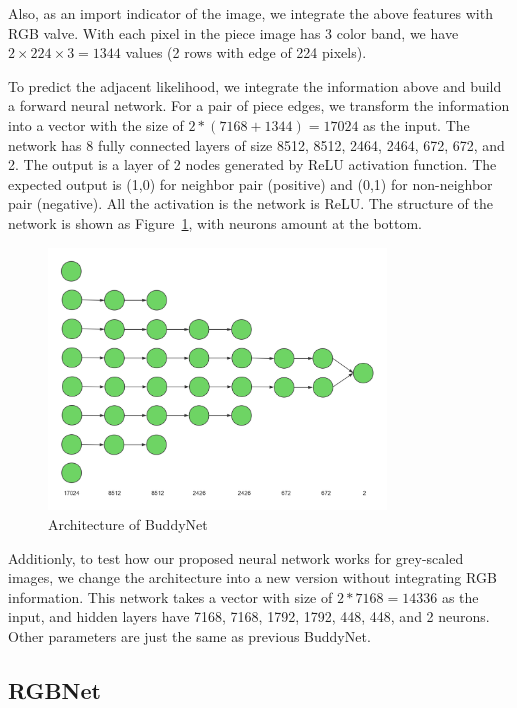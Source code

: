 \documentclass{article}
\begin{document}
Also, as an import indicator of the image, we integrate the above features with RGB valve. With each pixel in the piece image has 3 color band, we have $2\times 224\times 3=1344$ values (2 rows with edge of 224 pixels).

To predict the adjacent likelihood, we integrate the information above and build a forward neural network. For a pair of piece edges, we transform the information into a vector with the size of $2*(7168+1344)=17024$ as the input. The network has 8 fully connected layers of size 8512, 8512, 2464, 2464, 672, 672, and 2. The output is a layer of 2 nodes generated by ReLU activation function. The expected output is (1,0) for neighbor pair (positive) and (0,1) for non-neighbor pair (negative). All the activation is the network is ReLU. The structure of the network is shown as Figure~\ref{fig:buddynet}, with neurons amount at the bottom.

\begin{figure}
    \centering
    \includegraphics[width=0.8\textwidth]{BuddyNet}
    \caption{Architecture of BuddyNet}
    \label{fig:buddynet}
\end{figure}

Additionly, to test how our proposed neural network works for grey-scaled images, we change the architecture into a new version without integrating RGB information. This network takes a vector with size of $2*7168=14336$ as the input, and hidden layers have 7168, 7168, 1792, 1792, 448, 448, and 2 neurons. Other parameters are just the same as previous BuddyNet.

\subsection{RGBNet}
\end{document}
